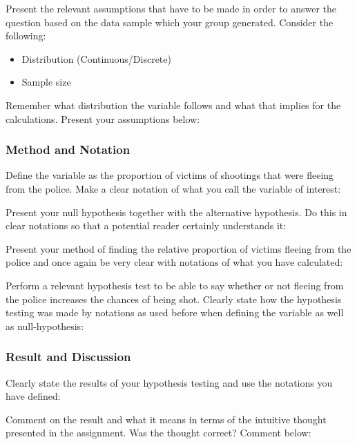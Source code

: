 \documentclass[a4paper, 10pt,serif]{article}
\begin{document}
Present the relevant assumptions that have to be made in order to answer the question based on the data sample which your group generated.
Consider the following:
\begin{itemize}
    \item Distribution (Continuous/Discrete)
    \item Sample size
\end{itemize}
Remember what distribution the variable follows and what that implies for the calculations. Present your assumptions below:

\bigskip
\bigskip
\bigskip
\bigskip

\subsubsection*{Method and Notation}

Define the variable as the proportion of victims of shootings that were fleeing from the police. Make a clear notation of what you call the variable of interest:

\bigskip
\bigskip
\bigskip
\bigskip

\noindent
Present your null hypothesis together with the alternative hypothesis. Do this in clear notations so that a potential reader certainly understands it:

\bigskip
\bigskip
\bigskip
\bigskip

\noindent
Present your method of finding the relative proportion of victims fleeing from the police and once again be very clear with notations of what you have calculated:

\bigskip
\bigskip
\bigskip
\bigskip

\noindent
Perform a relevant hypothesis test to be able to say whether or not fleeing from the police increases the chances of being shot. Clearly state how the hypothesis testing was made by notations as used before when defining the variable as well as null-hypothesis:

\bigskip
\bigskip
\bigskip
\bigskip

\subsubsection*{Result and Discussion}

Clearly state the results of your hypothesis testing and use the notations you have defined:

\bigskip
\bigskip
\bigskip
\bigskip

\noindent
Comment on the result and what it means in terms of the intuitive thought presented in the assignment. Was the thought correct? Comment below:
\end{document}

